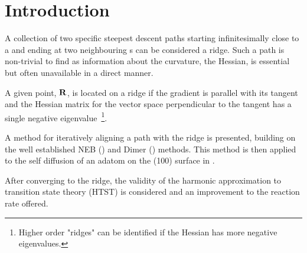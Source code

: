 \section{Introduction}
\label{sec:erm-introduction}

A collection of two specific steepest descent paths starting infinitesimally close to a  and ending at two neighbouring s can be considered a ridge.
Such a path is non-trivial to find as information about the curvature, the Hessian, is essential but often unavailable in a direct manner.

A given point, ${\mathrm{\mathbf{\bm{R}}}}$, is located on a ridge if the gradient is parallel with its tangent and the Hessian matrix for the vector space perpendicular to the tangent has a single negative eigenvalue~\footnote{Higher order "ridges" can be identified if the Hessian has more negative eigenvalues.}.

A method for iteratively aligning a path with the ridge is presented, building on the well established NEB () and Dimer () methods.
This method is then applied to the self diffusion of an adatom on the (100) surface in .

After converging to the ridge, the validity of the harmonic approximation to transition state theory (HTST) is considered and an improvement to the reaction rate offered.

